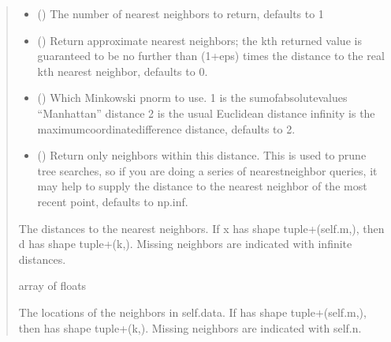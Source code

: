 \documentclass[a4paper,10pt,english]{report}
\begin{document}
\begin{fulllineitems}
\begin{fulllineitems}
\begin{quote}
\begin{description}
\begin{itemize}
\item {} 
\sphinxAtStartPar
{} (\sphinxstyleliteralemphasis{\sphinxupquote{, }}) \textendash{} The number of nearest neighbors to return, defaults to 1

\item {} 
\sphinxAtStartPar
{} (\sphinxstyleliteralemphasis{\sphinxupquote{, }}) \textendash{} Return approximate nearest neighbors; the kth returned value 
is guaranteed to be no further than (1+eps) times the 
distance to the real k\sphinxhyphen{}th nearest neighbor, defaults to 0.

\item {} 
\sphinxAtStartPar
{} (\sphinxstyleliteralemphasis{\sphinxupquote{, }}) \textendash{} Which Minkowski p\sphinxhyphen{}norm to use. 
1 is the sum\sphinxhyphen{}of\sphinxhyphen{}absolute\sphinxhyphen{}values “Manhattan” distance
2 is the usual Euclidean distance
infinity is the maximum\sphinxhyphen{}coordinate\sphinxhyphen{}difference distance, defaults to 2.

\item {} 
\sphinxAtStartPar
{} (\sphinxstyleliteralemphasis{\sphinxupquote{, }}) \textendash{} Return only neighbors within this distance. This is used to prune
tree searches, so if you are doing a series of nearest\sphinxhyphen{}neighbor
queries, it may help to supply the distance to the nearest neighbor
of the most recent point, defaults to np.inf.

\end{itemize}

\sphinxAtStartPar
The distances to the nearest neighbors. 
If x has shape tuple+(self.m,), then d has shape tuple+(k,).
Missing neighbors are indicated with infinite distances.

\sphinxAtStartPar
array of floats

\sphinxAtStartPar
The locations of the neighbors in self.data.
If  has shape tuple+(self.m,), then  has shape tuple+(k,).
Missing neighbors are indicated with self.n.


\end{description}
\end{quote}
\end{fulllineitems}
\end{fulllineitems}
\end{document}
